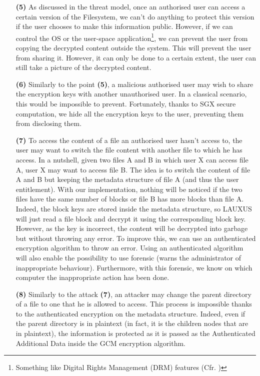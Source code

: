 \documentclass[../main.tex]{subfiles}
\begin{document}
\begin{itemize}
    \item[\textbf{(5)}] As discussed in the threat model, once an authorised user can access a certain version of the Filesystem, we can't do anything to protect this version if the user chooses to make this information public. However, if we can control the OS or the user-space application\footnote{Something like Digital Rights Management (DRM) features (Cfr. \cite{wiki:drm})}, we can prevent the user from copying the decrypted content outside the system. This will prevent the user from sharing it. However, it can only be done to a certain extent, the user can still take a picture of the decrypted content.
    \item[\textbf{(6)}] Similarly to the point \textbf{(5)}, a malicious authorised user may wish to share the encryption keys with another unauthorised user. In a classical scenario, this would be impossible to prevent. Fortunately, thanks to SGX secure computation, we hide all the encryption keys to the user, preventing them from disclosing them.
    \item[\textbf{(7)}] To access the content of a file an authorised user hasn't access to, the user may want to switch the file content with another file to which he has access. In a nutshell, given two files A and B in which user X can access file A, user X may want to access file B. The idea is to switch the content of file A and B but keeping the metadata structure of file A (and thus the user entitlement). With our implementation, nothing will be noticed if the two files have the same number of blocks or file B has more blocks than file A. Indeed, the block keys are stored inside the metadata structure, so LAUXUS will just read a file block and decrypt it using the corresponding block key. However, as the key is incorrect, the content will be decrypted into garbage but without throwing any error. To improve this, we can use an authenticated encryption algorithm to throw an error. Using an authenticated algorithm will also enable the possibility to use forensic (warns the administrator of inappropriate behaviour). Furthermore, with this forensic, we know on which computer the inappropriate action has been done.
    \item[\textbf{(8)}] Similarly to the attack \textbf{(7)}, an attacker may change the parent directory of a file to one that he is allowed to access. This process is impossible thanks to the authenticated encryption on the metadata structure. Indeed, even if the parent directory is in plaintext (in fact, it is the children nodes that are in plaintext), the information is protected as it is passed as the Authenticated Additional Data inside the GCM encryption algorithm.

\end{itemize}
\end{document}
